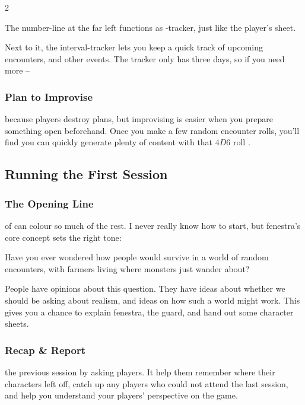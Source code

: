 \begin{multicols}{2}
\vspace{\baselineskip}

\noindent
The number-line at the far left functions as -tracker, just like the player's sheet.

Next to it, the \gls{interval}-tracker lets you keep a quick track of upcoming encounters, and other events.
The tracker only has three days, so if you need more --

\subsubsection{Plan to Improvise}
because players destroy plans, but improvising is easier when you prepare something open beforehand.
Once you make a few random encounter rolls, you'll find you can quickly generate plenty of content with that $4D6$ roll .

\null

\subsection{Running the First Session}

\subsubsection{The Opening Line}
\label{openingLine}
of  can colour so much of the rest.
I never really know how to start, but \gls{fenestra}'s core concept sets the right tone:

\begin{speechtext}
  Have you ever wondered how people would survive in a world of random encounters, with farmers living where monsters just wander about?
\end{speechtext}

People have opinions about this question.
They have ideas about whether we should be asking about realism, and ideas on how such a world might work.
This gives you a chance to explain \gls{fenestra}, the \gls{guard}, and hand out some character sheets.

\subsubsection{Recap \& Report}
the previous session by asking players.
It help them remember where their characters left off, catch up any players who could not attend the last session, and help you understand your players' perspective on the game.


\end{multicols}
